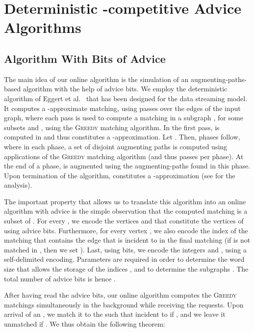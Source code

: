 \documentclass[a4paper]{article}
\begin{document}
\section{Deterministic -competitive Advice Algorithms} \label{sec:one-minus-eps}



\subsection{Algorithm With  Bits of Advice}



The main idea of our online algorithm is the simulation of an augmenting-paths-based algorithm
with the help of advice bits. We employ the deterministic algorithm of Eggert et al.~\cite{ekms11} that has
been designed for the data streaming model. It computes a -approximate
matching, using  passes over the edges of the input graph, where each pass 
is used to compute a matching  in a subgraph , for
some subsets  and , using the \textsc{Greedy}
matching algorithm.
In the first pass,  is computed in  and thus constitutes a -approximation.
Let .
Then,  phases follow, where in each phase, a set of disjoint augmenting
paths is computed using  applications of the \textsc{Greedy} matching
algorithm (and thus  passes per phase).
At the end of a phase,  is augmented using the augmenting-paths found in this phase. Upon
termination of the algorithm,  constitutes a -approximation (see \cite{ekms11} for
the analysis).

The important property that allows us to translate this algorithm into an online algorithm with advice
is the simple observation that the computed matching  is a subset of . For every ,
we encode the vertices
 and  that constitute the vertices of  using  advice bits.
Furthermore, for every vertex , we also encode the index 
of the matching  that contains the edge that is incident to  in the final matching 
(if  is not matched in , then we set ). Last, using  bits, we encode the integers
 and , using a self-delimited encoding. Parameters  are required in order to determine the word size
that allows the storage of the indices , and to determine the subgraphs . The total number of
advice bits is hence .

After having read the advice bits, our online algorithm computes the  \textsc{Greedy}
matchings  simultaneously in the background while receiving the requests. Upon arrival of an
, we match it to the  such that  incident to  if ,
and we leave it unmatched if . We thus obtain the following theorem:
\end{document}
